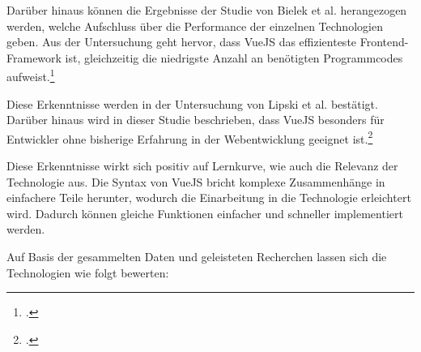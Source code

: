 Darüber hinaus können die Ergebnisse der Studie von Bielek et al. herangezogen werden, welche Aufschluss über die Performance der einzelnen Technologien geben.
Aus der Untersuchung geht hervor, dass VueJS das effizienteste Frontend-Framework ist, gleichzeitig die niedrigste Anzahl an benötigten Programmcodes aufweist.\footcite{Bielak_2022}

Diese Erkenntnisse werden in der Untersuchung von Lipski et al. bestätigt.
Darüber hinaus wird in dieser Studie beschrieben, dass VueJS besonders für Entwickler ohne bisherige Erfahrung in der Webentwicklung geeignet ist.\footcite{Lipski_2021}

Diese Erkenntnisse wirkt sich positiv auf Lernkurve, wie auch die Relevanz der Technologie aus.
Die Syntax von VueJS bricht komplexe Zusammenhänge in einfachere Teile herunter, wodurch die Einarbeitung in die Technologie erleichtert wird.
Dadurch können gleiche Funktionen einfacher und schneller implementiert werden.

Auf Basis der gesammelten Daten und geleisteten Recherchen lassen sich die Technologien wie folgt bewerten:

